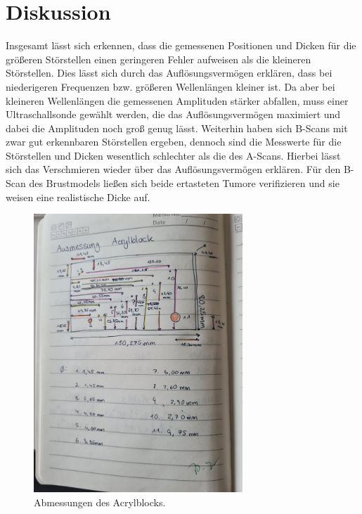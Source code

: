 \section{Diskussion}
\label{sec:Diskussion}
Insgesamt lässt sich erkennen, dass die gemessenen Positionen und Dicken für die größeren Störstellen einen
geringeren Fehler aufweisen als die kleineren Störstellen. Dies lässt sich durch das Auflösungsvermögen
erklären, dass bei niederigeren Frequenzen bzw. größeren Wellenlängen kleiner ist. Da aber bei kleineren
Wellenlängen die gemessenen Amplituden stärker abfallen, muss einer Ultraschallsonde gewählt werden, die
das Auflösungsvermögen maximiert und dabei die Amplituden noch groß genug lässt. Weiterhin haben sich B-Scans
mit zwar gut erkennbaren Störstellen ergeben, dennoch sind die Messwerte für die Störstellen und Dicken wesentlich
schlechter als die des A-Scans. Hierbei lässt sich das Verschmieren wieder über das Auflösungsvermögen
erklären. Für den B-Scan des Brustmodels ließen sich beide ertasteten Tumore verifizieren und sie weisen eine
realistische Dicke auf.

\label{sec:Anhang}
\begin{figure}
    \centering
    \includegraphics[width=0.7\textwidth]{messwerte/index.jpg}
    \caption{Abmessungen des Acrylblocks.}
\end{figure}


